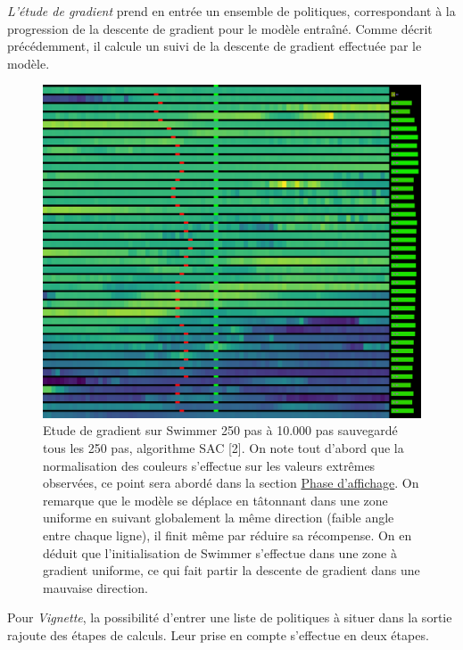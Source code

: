 \documentclass[12pt]{article}
\begin{document}
\emph{L'étude de gradient} prend en entrée un ensemble de politiques, correspondant à la progression de la descente de gradient pour le modèle entraîné. Comme décrit précédemment, il calcule un suivi de la descente de gradient effectuée par le modèle. \\

\begin{figure}[htp]
    \centering
    \includegraphics[width=15cm]{Images/gradientStudy_swimmer}
    \caption{Etude de gradient sur Swimmer 250 pas à 10.000 pas sauvegardé tous les 250 pas, algorithme SAC [2]. On note tout d'abord que la normalisation des couleurs s'effectue sur les valeurs extrêmes observées, ce point sera abordé dans la section \hyperref[sec:affichage]{Phase d'affichage}. On remarque que le modèle se déplace en tâtonnant dans une zone uniforme en suivant globalement la même direction (faible angle entre chaque ligne), il finit même par réduire sa récompense. On en déduit que l'initialisation de Swimmer s'effectue dans une zone à gradient uniforme, ce qui fait partir la descente de gradient dans une mauvaise direction.}
    \label{fig:gradientStudy}
\end{figure}

Pour \emph{Vignette}, la possibilité d'entrer une liste de politiques à situer dans la sortie rajoute des étapes de calculs. Leur prise en compte s'effectue en deux étapes. \\
\end{document}

